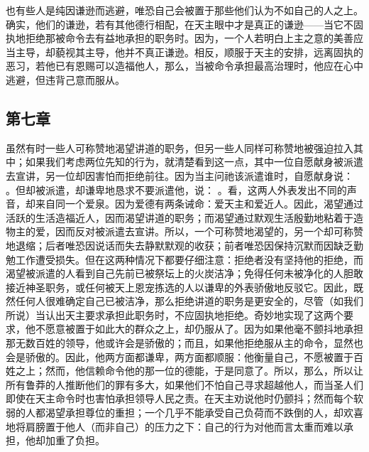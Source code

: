 也有些人是纯因谦逊而逃避，唯恐自己会被置于那些他们认为不如自己的人之上。确实，他们的谦逊，若有其他德行相配，在天主眼中才是真正的谦逊——当它不固执地拒绝那被命令去有益地承担的职务时。因为，一个人若明白上主之意的美善应当主导，却藐视其主导，他并不真正谦逊。相反，顺服于天主的安排，远离固执的恶习，若他已有恩赐可以造福他人，那么，当被命令承担最高治理时，他应在心中逃避，但违背己意而服从。\par


\subsection{第七章}

\par

虽然有时一些人可称赞地渴望讲道的职务，但另一些人同样可称赞地被强迫拉入其中；如果我们考虑两位先知的行为，就清楚看到这一点，其中一位自愿献身被派遣去宣讲，另一位却因害怕而拒绝前往。因为当主问祂该派遣谁时，自愿献身说： 。但却被派遣，却谦卑地恳求不要派遣他，说： 。看，这两人外表发出不同的声音，却来自同一个爱泉。因为爱德有两条诫命：爱天主和爱近人。因此，渴望通过活跃的生活造福近人，因而渴望讲道的职务；而渴望通过默观生活殷勤地粘着于造物主的爱，因而反对被派遣去宣讲。所以，一个可称赞地渴望的，另一个却可称赞地退缩；后者唯恐因说话而失去静默默观的收获；前者唯恐因保持沉默而因缺乏勤勉工作遭受损失。但在这两种情况下都要仔细注意：拒绝者没有坚持他的拒绝，而渴望被派遣的人看到自己先前已被祭坛上的火炭洁净；免得任何未被净化的人胆敢接近神圣职务，或任何被天上恩宠拣选的人以谦卑的外表骄傲地反驳它。因此，既然任何人很难确定自己已被洁净，那么拒绝讲道的职务是更安全的，尽管（如我们所说）当认出天主要求承担此职务时，不应固执地拒绝。奇妙地实现了这两个要求，他不愿意被置于如此大的群众之上，却仍服从了。因为如果他毫不颤抖地承担那无数百姓的领导，他或许会是骄傲的；而且，如果他拒绝服从主的命令，显然也会是骄傲的。因此，他两方面都谦卑，两方面都顺服：他衡量自己，不愿被置于百姓之上；然而，他信赖命令他的那一位的德能，于是同意了。所以，那么，所以让所有鲁莽的人推断他们的罪有多大，如果他们不怕自己寻求超越他人，而当圣人们即使在天主命令时也害怕承担领导人民之责。在天主劝说他时仍颤抖；然而每个软弱的人都渴望承担尊位的重担；一个几乎不能承受自己负荷而不跌倒的人，却欢喜地将肩膀置于他人（而非自己）的压力之下：自己的行为对他而言太重而难以承担，他却加重了负担。\par

